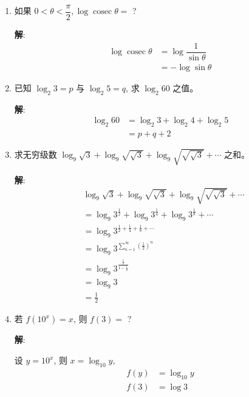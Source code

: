 \documentclass{report}
\newcommand{\sol}{\vspace{0.2cm}\textbf{解}:}
\begin{document}
\begin{multicols*}{2}
\begin{enumerate}[leftmargin=*]
        \item 如果 $0<\theta<\dfrac{\pi}{2}, \log \operatorname{cosec} \theta=$ ?

              \sol{}
              \begin{align*}
                  \log \operatorname{cosec} \theta & = \log \dfrac{1}{\sin \theta} \\
                                                   & = -\log \sin \theta
              \end{align*}

        \item 已知 $\log _2 3=p$ 与 $\log _2 5=q$, 求 $\log _2 60$ 之值。

              \sol{}
              \begin{align*}
                  \log_2 60 & = \log_2 3 + \log_2 4 + \log_2 5 \\
                            & = p + q + 2
              \end{align*}

        \item 求无穷级数 $\log _9 \sqrt{3}+\log _9 \sqrt{\sqrt{3}}+\log _9 \sqrt{\sqrt{\sqrt{3}}}+\cdots$ 之和。

              \sol{}
              \begin{align*}
                   & \log_9 \sqrt{3}+\log_9 \sqrt{\sqrt{3}}+\log_9 \sqrt{\sqrt{\sqrt{3}}}+\cdots         \\
                   & = \log_9 3^{\frac{1}{2}} + \log_9 3^{\frac{1}{4}} + \log_9 3^{\frac{1}{8}} + \cdots \\
                   & = \log_9 3^{\frac{1}{2} + \frac{1}{4} + \frac{1}{8} + \cdots}                       \\
                   & = \log_9 3^{\sum_{n=1}^{\infty} \left( \frac{1}{2} \right)^n}                       \\
                   & = \log_9 3^\frac{\frac{1}{2}}{1-\frac{1}{2}}                                        \\
                   & = \log_9 3                                                                          \\
                   & = \frac{1}{2}
              \end{align*}

        \item 若 $f\left(10^x\right)=x$, 则 $f(3)=$ ?

              \sol{}

              设 $y = 10^x$, 则 $x = \log_{10} y$,
              \begin{align*}
                  f(y) & = \log_{10} y \\
                  f(3) & = \log 3
              \end{align*}
    \end{enumerate}


\end{multicols*}
\end{document}
